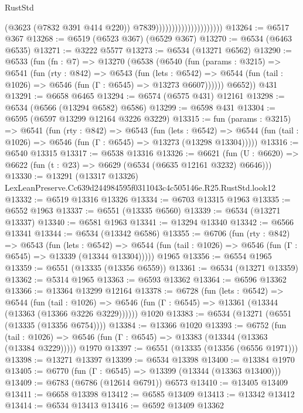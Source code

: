 \begin{lexlean}{RustStd}
\begin{coremodule}
                                              (@3623 (@7832 @391 @414 @220))
                                              @7839)))))))))))))))))))))
@13264 := @6517 @367
@13268 := @6519 (@6523 @367) (@6529 @367)
@13270 := @6534 (@6463 @6535)
@13271 := @3222 @5577
@13273 := @6534 (@13271 @6562)
@13290 := @6533
    (fun (fn : @7) =>
    @13270
      (@6538
        (@6540
          (fun (params : @3215) =>
          @6541
            (fun (rty : @842) =>
            @6543
              (fun (lets : @6542) =>
              @6544 (fun (tail : @1026) => @6546 (fun (Γ : @6545) => @13273 @6607))))))
        @6652))
    @431
@13291 := @6658 @6465
@13294 := @6574 (@6575 @431) @12161
@13298 := @6534 (@6566 (@13294 @6582) @6586)
@13299 := @6598 @431
@13304 := @6595 (@6597 @13299 @12164 @3226 @3229)
@13315 := fun (params : @3215) =>
  @6541
    (fun (rty : @842) =>
    @6543
      (fun (lets : @6542) =>
      @6544 (fun (tail : @1026) => @6546 (fun (Γ : @6545) => @13273 (@13298 @13304)))))
@13316 := @6540 @13315
@13317 := @6538 @13316
@13326 := @6621
    (fun (U : @6620) => @6622 (fun (t : @23) => @6629 (@6534 (@6635 @12161 @3232) @6646)))
@13330 := @13291
    (@13317 @13326)
    LexLeanPreserve.Cc639d244984595f0311043c4c505146e.R25.RustStd.look12
@13332 := @6519 @13316 @13326
@13334 := @6703 @13315 @1963
@13335 := @6552 @1963
@13337 := @6551 (@13335 @6560)
@13339 := @6534 (@13271 @13337)
@13340 := @6581 @1963
@13341 := @13294 @13340
@13342 := @6566 @13341
@13344 := @6534 (@13342 @6586)
@13355 := @6706
    (fun (rty : @842) =>
    @6543
      (fun (lets : @6542) =>
      @6544 (fun (tail : @1026) => @6546 (fun (Γ : @6545) => @13339 (@13344 @13304)))))
    @1965
@13356 := @6554 @1965
@13359 := @6551 (@13335 (@13356 @6559))
@13361 := @6534 (@13271 @13359)
@13362 := @5314 @1965
@13363 := @6593 @13362
@13364 := @6596 @13362
@13366 := @13364 @13299 @12164
@13378 := @6728
    (fun (lets : @6542) =>
    @6544
      (fun (tail : @1026) =>
      @6546 (fun (Γ : @6545) => @13361 (@13344 (@13363 (@13366 @3226 @3229))))))
    @1020
@13383 := @6534 (@13271 (@6551 (@13335 (@13356 @6754))))
@13384 := @13366 @1020
@13393 := @6752
    (fun (tail : @1026) => @6546 (fun (Γ : @6545) => @13383 (@13344 (@13363 (@13384 @3229)))))
    @1970
@13397 := @6551 (@13335 (@13356 (@6556 @1971)))
@13398 := @13271 @13397
@13399 := @6534 @13398
@13400 := @13384 @1970
@13405 := @6770 (fun (Γ : @6545) => @13399 (@13344 (@13363 @13400)))
@13409 := @6783 (@6786 (@12614 @6791)) @6573
@13410 := @13405 @13409
@13411 := @6658 @13398
@13412 := @6585 @13409
@13413 := @13342 @13412
@13414 := @6534 @13413
@13416 := @6592 @13409 @13362

\end{coremodule}
\end{lexlean}
